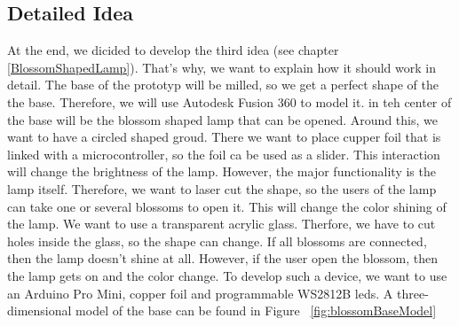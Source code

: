 \documentclass[doc.tex]{subfiles}
\begin{document}
    \subsection{Detailed Idea}
        \begin{flushleft}
            At the end, we dicided to develop the third idea (see chapter \ref{BlossomShapedLamp}). That's why, we want to explain 
            how it should work in detail. \newline
            The base of the prototyp will be milled, so we get a perfect shape of the the base. Therefore, we will use Autodesk Fusion 360\cite{autodeskFusion360}
            to model it. in teh center of the base will be the blossom shaped lamp that can be opened. Around this, we want to have a 
            circled shaped groud. There we want to place cupper foil that is linked with a microcontroller, %
            so the foil ca be used as a slider. This interaction will change the brightness of the lamp. \newline
            However, the major functionality is the lamp itself. Therefore, we want to laser cut the shape, so the users of the lamp can
            take one or several blossoms to open it. This will change the color shining of the lamp. We want to use a transparent acrylic glass.
            Therfore, we have to cut holes inside the glass, so the shape can change.  \newline
            If all blossoms are connected, then the lamp doesn't shine at all. However, if the user open the blossom, then the lamp gets on
            and the color change. 
            \newline
            \newline
            To develop such a device, we want to use an Arduino Pro Mini, copper foil and programmable WS2812B leds.
            A three-dimensional model of the base can be found in Figure ~\ref{fig:blossomBaseModel}
            

\end{flushleft}
\end{document}
